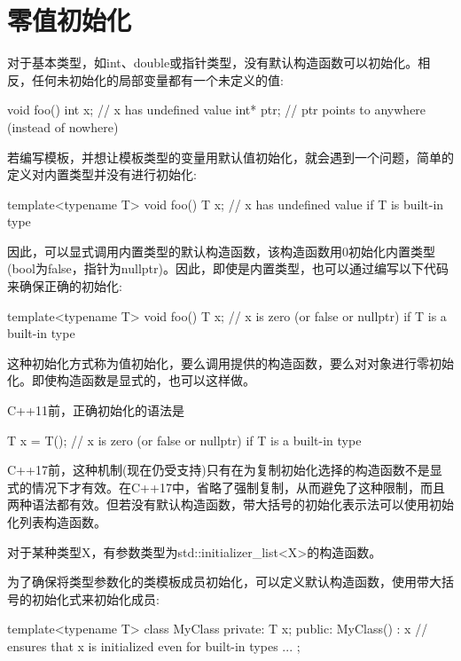 \section{零值初始化}
对于基本类型，如int、double或指针类型，没有默认构造函数可以初始化。相反，任何未初始化的局部变量都有一个未定义的值:

\begin{cpp}
void foo()
{
	int x; // x has undefined value
	int* ptr; // ptr points to anywhere (instead of nowhere)
}
\end{cpp}

若编写模板，并想让模板类型的变量用默认值初始化，就会遇到一个问题，简单的定义对内置类型并没有进行初始化:

\begin{cpp}
template<typename T>
void foo()
{
	T x; // x has undefined value if T is built-in type
}
\end{cpp}

因此，可以显式调用内置类型的默认构造函数，该构造函数用0初始化内置类型(bool为false，指针为nullptr)。因此，即使是内置类型，也可以通过编写以下代码来确保正确的初始化:

\begin{cpp}
template<typename T>
void foo()
{
	T x{}; // x is zero (or false or nullptr) if T is a built-in type
}
\end{cpp}

这种初始化方式称为值初始化，要么调用提供的构造函数，要么对对象进行零初始化。即使构造函数是显式的，也可以这样做。

C++11前，正确初始化的语法是

\begin{cpp}
T x = T(); // x is zero (or false or nullptr) if T is a built-in type
\end{cpp}

C++17前，这种机制(现在仍受支持)只有在为复制初始化选择的构造函数不是显式的情况下才有效。在C++17中，省略了强制复制，从而避免了这种限制，而且两种语法都有效。但若没有默认构造函数，带大括号的初始化表示法可以使用初始化列表构造函数。

\begin{notice}
对于某种类型X，有参数类型为std::initializer\_list<X>的构造函数。
\end{notice}

为了确保将类型参数化的类模板成员初始化，可以定义默认构造函数，使用带大括号的初始化式来初始化成员:

\begin{cpp}
template<typename T>
class MyClass {
private:
	T x;
public:
	MyClass() : x{} { // ensures that x is initialized even for built-in types
	}
	...
};
\end{cpp}

